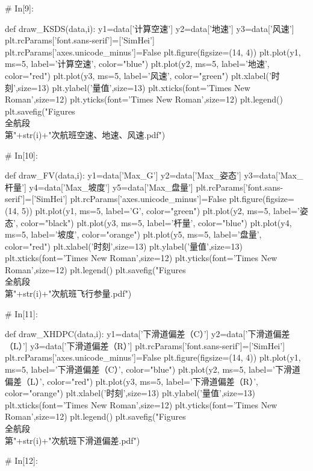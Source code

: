 \documentclass{MathorCupModeling}
\begin{document}
\begin{python}
# In[9]:


def draw_KSDS(data,i):
    y1=data['计算空速']
    y2=data['地速']
    y3=data['风速']
    plt.rcParams['font.sans-serif']=['SimHei']
    plt.rcParams['axes.unicode_minus']=False
    plt.figure(figsize=(14, 4))
    plt.plot(y1, ms=5, label='计算空速', color="blue")
    plt.plot(y2, ms=5, label='地速', color="red")
    plt.plot(y3, ms=5, label='风速', color="green")
    plt.xlabel('时刻',size=13)
    plt.ylabel('量值',size=13)
    plt.xticks(font='Times New Roman',size=12)
    plt.yticks(font='Times New Roman',size=12)
    plt.legend()
    plt.savefig("Figures\\全航段\\第"+str(i)+"次航班空速、地速、风速.pdf")


# In[10]:


def draw_FV(data,i):
    y1=data['Max_G']
    y2=data['Max_姿态']
    y3=data['Max_杆量']
    y4=data['Max_坡度']
    y5=data['Max_盘量']
    plt.rcParams['font.sans-serif']=['SimHei']
    plt.rcParams['axes.unicode_minus']=False
    plt.figure(figsize=(14, 5))
    plt.plot(y1, ms=5, label='G', color="green")
    plt.plot(y2, ms=5, label='姿态', color="black")
    plt.plot(y3, ms=5, label='杆量', color="blue")
    plt.plot(y4, ms=5, label='坡度', color="orange")
    plt.plot(y5, ms=5, label='盘量', color="red")
    plt.xlabel('时刻',size=13)
    plt.ylabel('量值',size=13)
    plt.xticks(font='Times New Roman',size=12)
    plt.yticks(font='Times New Roman',size=12)
    plt.legend()
    plt.savefig("Figures\\全航段\\第"+str(i)+"次航班飞行参量.pdf")


# In[11]:


def draw_XHDPC(data,i):
    y1=data['下滑道偏差（C）']
    y2=data['下滑道偏差（L）']
    y3=data['下滑道偏差（R）']
    plt.rcParams['font.sans-serif']=['SimHei']
    plt.rcParams['axes.unicode_minus']=False
    plt.figure(figsize=(14, 4))
    plt.plot(y1, ms=5, label='下滑道偏差（C）', color="blue")
    plt.plot(y2, ms=5, label='下滑道偏差（L）', color="red")
    plt.plot(y3, ms=5, label='下滑道偏差（R）', color="orange")
    plt.xlabel('时刻',size=13)
    plt.ylabel('量值',size=13)
    plt.xticks(font='Times New Roman',size=12)
    plt.yticks(font='Times New Roman',size=12)
    plt.legend()
    plt.savefig("Figures\\全航段\\第"+str(i)+"次航班下滑道偏差.pdf")


# In[12]:



\end{python}
\end{document}
